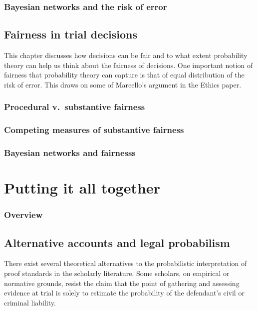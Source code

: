 \documentclass[]{book}
\begin{document}
\section{Bayesian networks and 
the risk of error}

\chapter{Fairness in trial decisions}

This chapter discusses how decisions can be fair and to what extent
probability theory can help us think about the fairness of decisions.
One important notion of fairness that probability theory can capture is
that of equal distribution of the risk of error. This draws on some of
Marcello's argument in the Ethics paper.


\section{Procedural v.\ substantive fairness}

\section{Competing measures of substantive fairness}

\section{Bayesian networks and fairnesss}

\part{Putting it all together}

\section*{Overview}

\chapter{Alternative accounts and legal probabilism}

There exist several theoretical alternatives to the probabilistic
interpretation of proof standards in the scholarly literature. Some
scholars, on empirical or normative grounds, resist the claim that the
point of gathering and assessing evidence at trial is solely to estimate
the probability of the defendant's civil or criminal liability.
\end{document}

